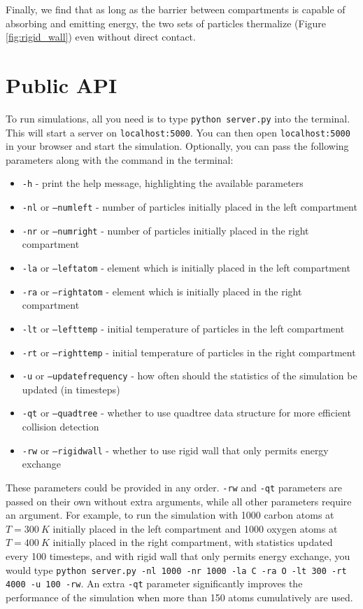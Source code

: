 \documentclass[10pt]{article}
\begin{document}
Finally, we find that as long as the barrier between compartments is capable of absorbing and emitting energy, the two sets of particles thermalize (Figure \ref{fig:rigid_wall}) even without direct contact.

\section{Public API}
\label{sec:public-api}
To run simulations, all you need is to type \texttt{python server.py} into the terminal. This will start a server on \texttt{localhost:5000}. You can then open \texttt{localhost:5000} in your browser and start the simulation. Optionally, you can pass the following parameters along with the command in the terminal:
\begin{itemize}
    \itemsep-0.5em
    \item \texttt{-h} - print the help message, highlighting the available parameters
    \item \texttt{-nl} or \texttt{--numleft} - number of particles initially placed in the left compartment
    \item \texttt{-nr} or \texttt{--numright} - number of particles initially placed in the right compartment
    \item \texttt{-la} or \texttt{--leftatom} - element which is initially placed in the left compartment
    \item \texttt{-ra} or \texttt{--rightatom} - element which is initially placed in the right compartment
    \item \texttt{-lt} or \texttt{--lefttemp} - initial temperature of particles in the left compartment
    \item \texttt{-rt} or \texttt{--righttemp} - initial temperature of particles in the right compartment
    \item \texttt{-u} or \texttt{--updatefrequency} - how often should the statistics of the simulation be updated (in timesteps)
    \item \texttt{-qt} or \texttt{--quadtree} - whether to use quadtree data structure for more efficient collision detection
    \item \texttt{-rw} or \texttt{--rigidwall} - whether to use rigid wall that only permits energy exchange
\end{itemize}
These parameters could be provided in any order. \texttt{-rw} and \texttt{-qt} parameters are passed on their own without extra arguments, while all other parameters require an argument. For example, to run the simulation with 1000 carbon atoms at $T=\qty{300}{K}$ initially placed in the left compartment and 1000 oxygen atoms at $T=\qty{400}{K}$ initially placed in the right compartment, with statistics updated every 100 timesteps, and with rigid wall that only permits energy exchange, you would type \texttt{python server.py -nl 1000 -nr 1000 -la C -ra O -lt 300 -rt 4000 -u 100 -rw}. An extra \texttt{-qt} parameter significantly improves the performance of the simulation when more than 150 atoms cumulatively are used.
\end{document}
